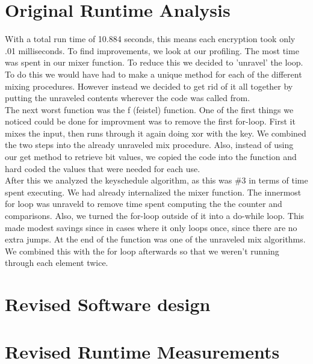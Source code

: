\documentclass[10pt]{article}
\begin{document}
\section{Original Runtime Analysis}
\indent With a total run time of 10.884 seconds, this means each encryption took only .01 milliseconds.  To find improvements, we look at our profiling.  The most time was spent in our mixer function.  To reduce this we decided to 'unravel' the loop.  To do this we would have had to make a unique method for each of the different mixing procedures.  However instead we decided to get rid of it all together by putting the unraveled contents wherever the code was called from.
\\ \indent The next worst function was the f (feistel) function.  One of the first things we noticed could be done for improvment was to remove the first for-loop. First it mixes the input, then runs through it again doing xor with the key. We combined the two steps into the already unraveled mix procedure. Also, instead of using our get method to retrieve bit values, we copied the code into the function and hard coded the values that were needed for each use.
\\ \indent After this we analyzed the keyschedule algorithm, as this was \#3 in terms of time spent executing.  We had already internalized the mixer function.  The innermost for loop was unraveld to remove time spent computing the the counter and comparisons.  Also, we turned the for-loop outside of it into a do-while loop.  This made modest savings since in cases where it only loops once, since there are no extra jumps.  At the end of the function was one of the unraveled mix algorithms.  We combined this with the for loop afterwards so that we weren't running through each element twice.

\section{Revised Software design}

\section{Revised Runtime Measurements}
\end{document}
